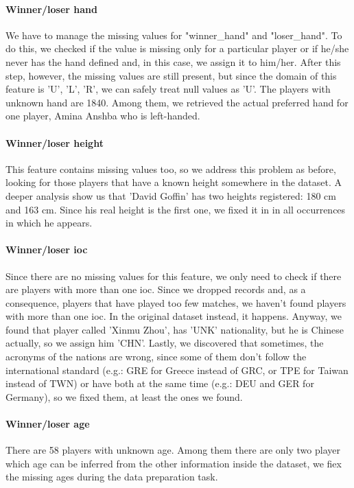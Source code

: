 \paragraph{Winner/loser hand}
We have to manage the missing values for "winner\_hand" and "loser\_hand". To do this, we checked if the value is missing only for a particular player or if he/she never has the hand defined and, in this case, we assign it to him/her. After this step, however, the missing values are still present, but since the domain of this feature is {'U', 'L', 'R'}, we can safely treat null values as 'U'. The players with unknown hand are 1840. Among them, we retrieved the actual preferred hand for one player, Amina Anshba who is left-handed.

\paragraph{Winner/loser height}
This feature contains missing values too, so we address this problem as before, looking for those players that have a known height somewhere in the dataset. A deeper analysis show us that 'David Goffin' has two heights registered: 180 cm and 163 cm. Since his real height is the first one, we fixed it in in all occurrences in which he appears.

\paragraph{Winner/loser ioc}
Since there are no missing values for this feature, we only need to check if there are players with more than one ioc. Since we dropped records and, as a consequence, players that have played too few matches, we haven't found players with more than one ioc. In the original dataset instead, it happens. Anyway, we found that player called 'Xinmu Zhou', has 'UNK' nationality, but he is Chinese actually, so we assign him 'CHN'. Lastly, we discovered that sometimes, the acronyms of the nations are wrong, since some of them don't follow the international standard (e.g.: GRE for Greece instead of GRC, or TPE for Taiwan instead of TWN) or have both at the same time (e.g.: DEU and GER for Germany), so we fixed them, at least the ones we found.

\paragraph{Winner/loser age}
There are 58 players with unknown age. Among them there are only two player which age can be inferred from the other information inside the dataset, we fiex the missing ages during the data preparation task. 

